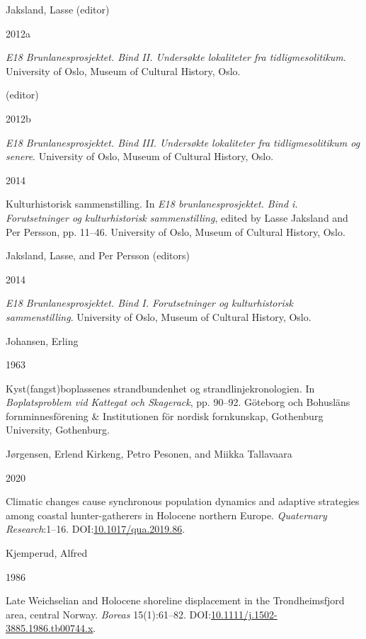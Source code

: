 \documentclass[
]{article}
\newlength{\cslhangindent}
\newlength{\csllabelwidth}
\newlength{\cslentryspacingunit} %
\newenvironment{CSLReferences}[2] %
 {%
  \setlength{\parindent}{0pt}
  \ifodd #1
  \let\oldpar\par
  \def\par{\hangindent=\cslhangindent\oldpar}
  \fi
  \setlength{\parskip}{#2\cslentryspacingunit}
 }%
 {}
\newcommand{\CSLBlock}[1]{#1\hfill\break}
\newcommand{\CSLLeftMargin}[1]{\parbox[t]{\csllabelwidth}{#1}}
\newcommand{\CSLRightInline}[1]{\parbox[t]{\linewidth - \csllabelwidth}{#1}\break}
\begin{document}
\begin{CSLReferences}{0}{0}
\leavevmode{}%
\CSLBlock{Jaksland, Lasse (editor)}
\CSLLeftMargin{ 2012a}
\CSLRightInline{\emph{{E18 Brunlanesprosjektet. Bind II. Undersøkte lokaliteter fra tidligmesolitikum}}. University of Oslo, Museum of Cultural History, Oslo.}

\leavevmode{}%
\CSLBlock{ (editor)}
\CSLLeftMargin{ 2012b}
\CSLRightInline{\emph{{E18 Brunlanesprosjektet. Bind III. Undersøkte lokaliteter fra tidligmesolitikum og senere}}. University of Oslo, Museum of Cultural History, Oslo.}

\leavevmode{}%
\CSLLeftMargin{ 2014 }
\CSLRightInline{Kulturhistorisk sammenstilling. In \emph{E18 brunlanesprosjektet. Bind i. Forutsetninger og kulturhistorisk sammenstilling}, edited by Lasse Jaksland and Per Persson, pp. 11--46. University of Oslo, Museum of Cultural History, Oslo.}

\leavevmode{}%
\CSLBlock{Jaksland, Lasse, and Per Persson (editors)}
\CSLLeftMargin{ 2014}
\CSLRightInline{\emph{{E18 Brunlanesprosjektet. Bind I. Forutsetninger og kulturhistorisk sammenstilling}}. University of Oslo, Museum of Cultural History, Oslo.}

\leavevmode{}%
\CSLBlock{Johansen, Erling}
\CSLLeftMargin{ 1963}
\CSLRightInline{{Kyst(fangst)boplassenes strandbundenhet og strandlinjekronologien}. In \emph{{Boplatsproblem vid Kattegat och Skagerack}}, pp. 90--92. Göteborg och Bohusläns fornminnesförening \& Institutionen för nordisk fornkunskap, Gothenburg University, Gothenburg.}

\leavevmode{}%
\CSLBlock{Jørgensen, Erlend Kirkeng, Petro Pesonen, and Miikka Tallavaara}
\CSLLeftMargin{ 2020}
\CSLRightInline{{Climatic changes cause synchronous population dynamics and adaptive strategies among coastal hunter-gatherers in Holocene northern Europe}. \emph{Quaternary Research}:1--16. DOI:\href{https://doi.org/10.1017/qua.2019.86}{10.1017/qua.2019.86}.}

\leavevmode{}%
\CSLBlock{Kjemperud, Alfred}
\CSLLeftMargin{ 1986}
\CSLRightInline{{Late Weichselian and Holocene shoreline displacement in the Trondheimsfjord area, central Norway}. \emph{Boreas} 15(1):61--82. DOI:\href{https://doi.org/10.1111/j.1502-3885.1986.tb00744.x}{10.1111/j.1502-3885.1986.tb00744.x}.}


\end{CSLReferences}
\end{document}
